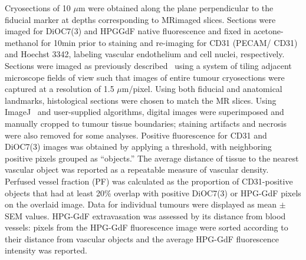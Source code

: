 Cryosections of 10 $\mu$m were obtained along the plane perpendicular to the fiducial marker at depths corresponding to MRimaged slices.
Sections were imaged for DiOC7(3) and HPGGdF native fluorescence and fixed in acetone-methanol for 10min prior to staining and re-imaging for CD31 (PECAM/ CD31) and Hoechst 3342, labeling vascular endothelium and cell nuclei, respectively.
Sections were imaged as previously described~\cite{Kyle:2007ch} using a system of tiling adjacent microscope fields of view such that images of entire tumour cryosections were captured at a resolution of 1.5 $\mu$m/pixel.
Using both fiducial and anatomical landmarks, histological sections were chosen to match the MR slices.
Using ImageJ~\cite{Collins:2007jr} and user-supplied algorithms, digital images were superimposed and manually cropped to tumour tissue boundaries; staining artifacts and necrosis were also removed for some analyses.
Positive fluorescence for CD31 and DiOC7(3) images was obtained by applying a threshold, with neighboring positive pixels grouped as “objects.” The average distance of tissue to the nearest vascular object was reported as a repeatable measure of vascular density.
Perfused vessel fraction (PF) was calculated as the proportion of CD31-positive objects that had at least 20\% overlap with positive DiOC7(3) or HPG-GdF pixels on the overlaid image.
Data for individual tumours were displayed as mean $\pm$ SEM values.
HPG-GdF extravasation was assessed by its distance from blood vessels: pixels from the HPG-GdF fluorescence image were sorted according to their distance from vascular objects and the average HPG-GdF fluorescence intensity was reported.

